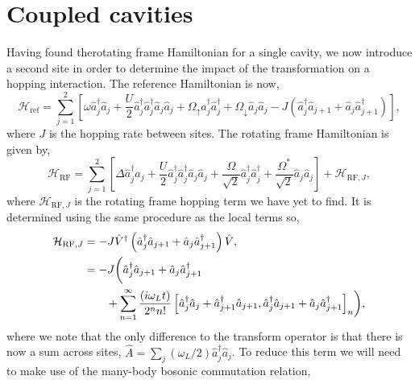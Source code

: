\section{Coupled cavities}

Having found therotating frame Hamiltonian for a single cavity, we now introduce a second site in order to determine the impact of the transformation on a hopping interaction. The reference Hamiltonian is now,
\begin{equation}
	\mathcal{H}_{\mathrm{ref}} = \sum_{j=1}^{2}\left[\omega\hat{a}_{j}^{\dagger}\hat{a}_{j} + \frac{U}{2}\hat{a}_{j}^{\dagger}\hat{a}_{j}^{\dagger}\hat{a}_{j}\hat{a}_{j} + \Omega_{\uparrow}\hat{a}_{j}^{\dagger}\hat{a}_{j}^{\dagger} + \Omega_{\downarrow}\hat{a}_{j}\hat{a}_{j} - J\left(\hat{a}_{j}^{\dagger}\hat{a}_{j+1} + \hat{a}_{j}\hat{a}_{j+1}^{\dagger} \right) \right],
	\label{eq:rot23}
\end{equation}
where \(J\) is the hopping rate between sites. The rotating frame Hamiltonian is given by,
\begin{equation}
	\mathcal{H}_{\mathrm{RF}} = \sum_{j=1}^{2} \left[ \Delta\hat{a}_{j}^{\dagger}\hat{a}_{j} + \frac{U}{2}\hat{a}_{j}^{\dagger}\hat{a}_{j}^{\dagger}\hat{a}_{j}\hat{a}_{j} + \frac{\Omega}{\sqrt{2}}\hat{a}_{j}^{\dagger}\hat{a}_{j}^{\dagger} + \frac{\Omega^{*}}{\sqrt{2}}\hat{a}_{j}\hat{a}_{j} \right] + \mathcal{H}_{\mathrm{RF},J},
	\label{eq:rot24}
\end{equation}
where \(\mathcal{H}_{\mathrm{RF},J}\) is the rotating frame hopping term we have yet to find. It is determined using the same procedure as the local terms so,
\begin{align}
	\mathcal{H}_{\mathrm{RF},J} &= -J\hat{V}^{\dagger}\left(\hat{a}_{j}^{\dagger}\hat{a}_{j+1} + \hat{a}_{j}\hat{a}_{j+1}^{\dagger}\right)\hat{V}, \notag \\
	&= -J\biggl(\hat{a}_{j}^{\dagger}\hat{a}_{j+1} + \hat{a}_{j}\hat{a}_{j+1}^{\dagger} \notag \\
	&\qquad + \sum_{n=1}^{\infty} \frac{(i\omega_{L}t)}{2^{n}n!} \left[\hat{a}_{j}^{\dagger}\hat{a}_{j} + \hat{a}_{j+1}^{\dagger}\hat{a}_{j+1}, \hat{a}_{j}^{\dagger}\hat{a}_{j+1} + \hat{a}_{j}\hat{a}_{j+1}^{\dagger}\right]_{n}\biggr),
	\label{eq:rot25}
\end{align}
where we note that the only difference to the transform operator is that there is now a sum across sites, \(\hat{A} = \sum_{j} (\omega_{L}/2)\hat{a}_{j}^{\dagger}\hat{a}_{j}\). To reduce this term we will need to make use of the many-body bosonic commutation relation,
